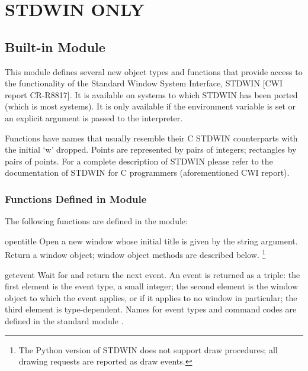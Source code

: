 \chapter{STDWIN ONLY}

\section{Built-in Module }

This module defines several new object types and functions that
provide access to the functionality of the Standard Window System
Interface, STDWIN [CWI report CR-R8817].
It is available on systems to which STDWIN has been ported (which is
most systems).
It is only available if the  environment variable is set
or an explicit  argument is passed to
the interpreter.

Functions have names that usually resemble their C STDWIN counterparts
with the initial `w' dropped.
Points are represented by pairs of integers; rectangles
by pairs of points.
For a complete description of STDWIN please refer to the documentation
of STDWIN for C programmers (aforementioned CWI report).

\subsection{Functions Defined in Module }

The following functions are defined in the  module:

\renewcommand{\indexsubitem}{(in module stdwin)}
\begin{funcdesc}{open}{title}
Open a new window whose initial title is given by the string argument.
Return a window object; window object methods are described below.%
\footnote{The Python version of STDWIN does not support draw procedures; all
	drawing requests are reported as draw events.}
\end{funcdesc}

\begin{funcdesc}{getevent}{}
Wait for and return the next event.
An event is returned as a triple: the first element is the event
type, a small integer; the second element is the window object to which
the event applies, or
if it applies to no window in particular;
the third element is type-dependent.
Names for event types and command codes are defined in the standard
module
.
\end{funcdesc}

